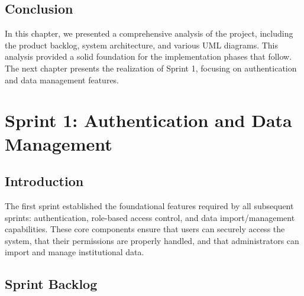 \documentclass[12pt,a4paper]{report}
\begin{document}
\section{Conclusion}

In this chapter, we presented a comprehensive analysis of the project, including the product backlog, system architecture, and various UML diagrams. This analysis provided a solid foundation for the implementation phases that follow. The next chapter presents the realization of Sprint 1, focusing on authentication and data management features.

\chapter{Sprint 1: Authentication and Data Management}

\section{Introduction}

The first sprint established the foundational features required by all subsequent sprints: authentication, role-based access control, and data import/management capabilities. These core components ensure that users can securely access the system, that their permissions are properly handled, and that administrators can import and manage institutional data.

\section{Sprint Backlog}
\end{document}
